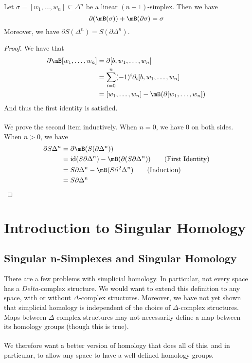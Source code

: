 \documentclass[a4paper]{article}
\begin{document}
\begin{lmm}{}{} Let $\sigma=[w_1,\dots,w_n]\subseteq\Delta^n$ be a linear $(n-1)$-simplex. Then we have $$\partial(\mB(\sigma))+\mB(\partial\sigma)=\sigma$$ Moreover, we have $\partial S(\Delta^n)=S(\partial\Delta^n)$. \tcbline
\begin{proof}
We have that 
\begin{align*}
\partial\mB[w_1,\dots,w_n]&=\partial[b,w_1,\dots,w_n]\\
&=\sum_{i=0}^n(-1)^i\partial_i[b,w_1,\dots,w_n]\\
&=[w_1,\dots,w_n]-\mB(\partial[w_1,\dots,w_n])
\end{align*}
And thus the first identity is satisfied. \\~\\
We prove the second item inductively. When $n=0$, we have $0$ on both sides. When $n>0$, we have
\begin{align*}
\partial S\Delta^n&=\partial\mB(S(\partial\Delta^n))\\
&=\text{id}(S\partial\Delta^n)-\mB(\partial(S\partial\Delta^n))\tag{First Identity}\\
&=S\partial\Delta^n-\mB(S\partial^2\Delta^n)\tag{Induction}\\
&=S\partial\Delta^n
\end{align*}
\end{proof}
\end{lmm}

\pagebreak
\section{Introduction to Singular Homology}
\subsection{Singular n-Simplexes and Singular Homology}
There are a few problems with simplicial homology. In particular, not every space has a $Delta$-complex structure. We would want to extend this definition to any space, with or without $\Delta$-complex structures. Moreover, we have not yet shown that simplicial homology is independent of the choice of $\Delta$-complex structures. Maps between $\Delta$-complex structures may not necessarily define a map between its homology groups (though this is true). \\~\\
We therefore want a better version of homology that does all of this, and in particular, to allow any space to have a well defined homology groups. 
\end{document}
